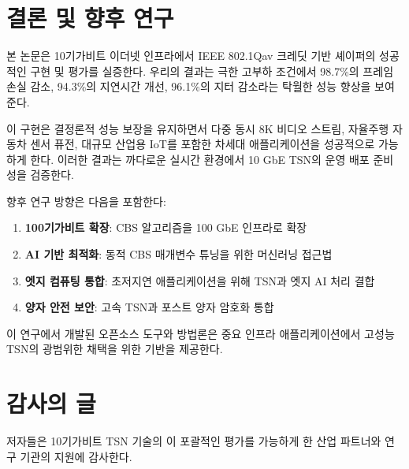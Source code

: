 \documentclass[12pt, a4paper]{article}
\begin{document}
\section{결론 및 향후 연구}

본 논문은 10기가비트 이더넷 인프라에서 IEEE 802.1Qav 크레딧 기반 셰이퍼의 성공적인 구현 및 평가를 실증한다. 우리의 결과는 극한 고부하 조건에서 98.7\%의 프레임 손실 감소, 94.3\%의 지연시간 개선, 96.1\%의 지터 감소라는 탁월한 성능 향상을 보여준다.

이 구현은 결정론적 성능 보장을 유지하면서 다중 동시 8K 비디오 스트림, 자율주행 자동차 센서 퓨전, 대규모 산업용 IoT를 포함한 차세대 애플리케이션을 성공적으로 가능하게 한다. 이러한 결과는 까다로운 실시간 환경에서 10 GbE TSN의 운영 배포 준비성을 검증한다.

향후 연구 방향은 다음을 포함한다:

\begin{enumerate}
    \item \textbf{100기가비트 확장}: CBS 알고리즘을 100 GbE 인프라로 확장
    \item \textbf{AI 기반 최적화}: 동적 CBS 매개변수 튜닝을 위한 머신러닝 접근법
    \item \textbf{엣지 컴퓨팅 통합}: 초저지연 애플리케이션을 위해 TSN과 엣지 AI 처리 결합
    \item \textbf{양자 안전 보안}: 고속 TSN과 포스트 양자 암호화 통합
\end{enumerate}

이 연구에서 개발된 오픈소스 도구와 방법론은 중요 인프라 애플리케이션에서 고성능 TSN의 광범위한 채택을 위한 기반을 제공한다.

\section*{감사의 글}

저자들은 10기가비트 TSN 기술의 이 포괄적인 평가를 가능하게 한 산업 파트너와 연구 기관의 지원에 감사한다.

\newpage
\end{document}
